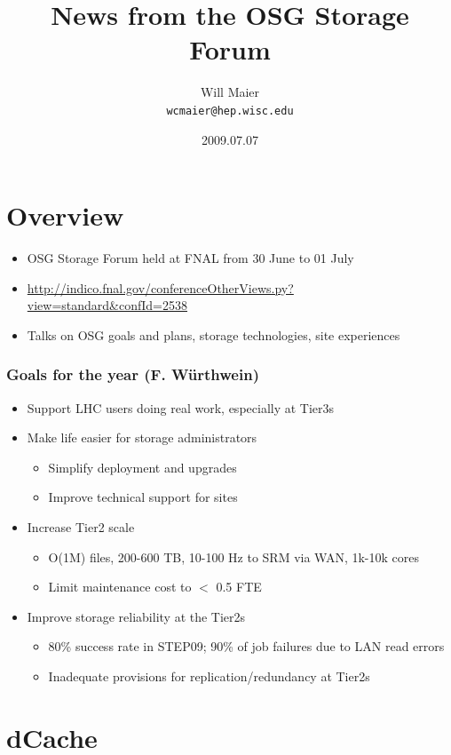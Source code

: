 \documentclass{beamer}
\title{News from the OSG Storage Forum}
\author[Maier]{
    Will Maier \\ 
    {\tt wcmaier@hep.wisc.edu}}
\institute[Wisconsin]{University of Wisconsin - High Energy Physics}
\date{2009.07.07}
\begin{document}
\begin{frame}
    \titlepage
\end{frame}

\section{Overview}
\begin{frame}
\begin{itemize}
	\item OSG Storage Forum held at FNAL from 30 June to 01 July
	\item \url{http://indico.fnal.gov/conferenceOtherViews.py?view=standard&confId=2538}
	\item Talks on OSG goals and plans, storage technologies, site experiences
\end{itemize}
\end{frame}

\begin{frame}
\frametitle{Goals for the year (F. W\"urthwein)}
\begin{itemize}
	\item Support LHC users doing real work, especially at Tier3s
	\item Make life easier for storage administrators
	\begin{itemize}
		\item Simplify deployment and upgrades
		\item Improve technical support for sites
	\end{itemize}
	\item Increase Tier2 scale
	\begin{itemize}
		\item O(1M) files, 200-600 TB, 10-100 Hz to SRM via WAN, 1k-10k cores
		\item Limit maintenance cost to $<$ 0.5 FTE
	\end{itemize}
	\item Improve storage reliability at the Tier2s
	\begin{itemize}
		\item 80\% success rate in STEP09; 90\% of job failures due to LAN read errors
		\item Inadequate provisions for replication/redundancy at Tier2s
	\end{itemize}
\end{itemize}
\end{frame}

\section{dCache}
\end{document}
